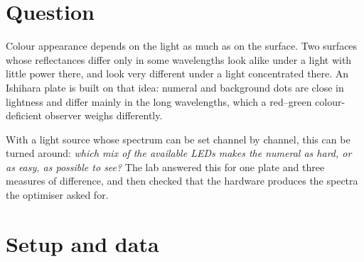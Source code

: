 \documentclass[10pt,a4paper]{article}
\begin{document}
\section{Question}

Colour appearance depends on the light as much as on the surface. Two surfaces whose reflectances differ only in
some wavelengths look alike under a light with little power there, and look very different under a light concentrated
there. An Ishihara plate is built on that idea: numeral and background dots are close in lightness and differ mainly in
the long wavelengths, which a red--green colour-deficient observer weighs differently.

With a light source whose spectrum can be set channel by channel, this can be turned around: \emph{which mix of the
available LEDs makes the numeral as hard, or as easy, as possible to see?} The lab answered this for one plate and three
measures of difference, and then checked that the hardware produces the spectra the optimiser asked for.

\section{Setup and data}
\end{document}
